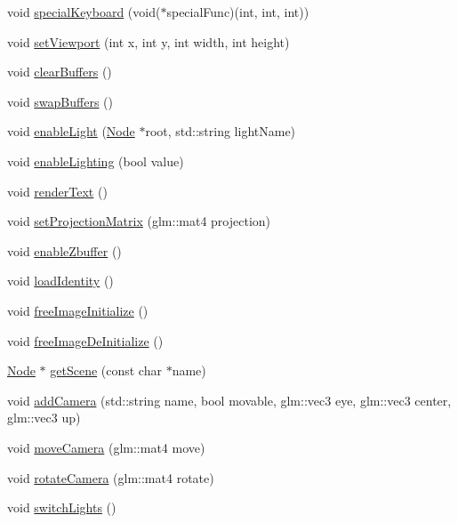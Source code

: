 \begin{DoxyCompactItemize}
\item 
void \hyperlink{classEngine_ac5a3f2e2081bec8580ba9606822da90f}{special\+Keyboard} (void($\ast$special\+Func)(int, int, int))
\item 
void \hyperlink{classEngine_a978bb7f90f67e2b51b03a8ce2a8d9b2b}{set\+Viewport} (int x, int y, int width, int height)
\item 
void \hyperlink{classEngine_acc1431883e68b03c4a873ffb222f55cc}{clear\+Buffers} ()
\item 
void \hyperlink{classEngine_a0544e301002dd8af6958796fee18430e}{swap\+Buffers} ()
\item 
void \hyperlink{classEngine_a177922eb00045463beb7b5f0e2a59da4}{enable\+Light} (\hyperlink{classNode}{Node} $\ast$root, std\+::string light\+Name)
\item 
void \hyperlink{classEngine_a3f48d4bd248688249c8b1ad74d33117e}{enable\+Lighting} (bool value)
\item 
void \hyperlink{classEngine_a5b6cc6eb1b71934aadc4402c67f983ed}{render\+Text} ()
\item 
void \hyperlink{classEngine_aca42da4f6570409cecaf513efb86ada5}{set\+Projection\+Matrix} (glm\+::mat4 projection)
\item 
void \hyperlink{classEngine_a0508a50886cadf9d264e06811fa49e45}{enable\+Zbuffer} ()
\item 
void \hyperlink{classEngine_ab0d411e34b7ec898bd5e29f02feb4644}{load\+Identity} ()
\item 
void \hyperlink{classEngine_abeafe4eb10b3068b3623b2ca905e1fb5}{free\+Image\+Initialize} ()
\item 
void \hyperlink{classEngine_a276a5a08cd53ff62495737ede775c23b}{free\+Image\+De\+Initialize} ()
\item 
\hyperlink{classNode}{Node} $\ast$ \hyperlink{classEngine_a0966e5d9a460caedd44b9862aaf6a5f1}{get\+Scene} (const char $\ast$name)
\item 
void \hyperlink{classEngine_accc0b5153b3b63bb0de0446842bb61b2}{add\+Camera} (std\+::string name, bool movable, glm\+::vec3 eye, glm\+::vec3 center, glm\+::vec3 up)
\item 
void \hyperlink{classEngine_af6210e638d3512ddf222ec53b1c29a57}{move\+Camera} (glm\+::mat4 move)
\item 
void \hyperlink{classEngine_aa6e7ac4ee48c5288089d6d717b421168}{rotate\+Camera} (glm\+::mat4 rotate)
\item 
void \hyperlink{classEngine_a4c2cc9c594912622eb4c21ccb73a3a6d}{switch\+Lights} ()
\item 

\end{DoxyCompactItemize}
